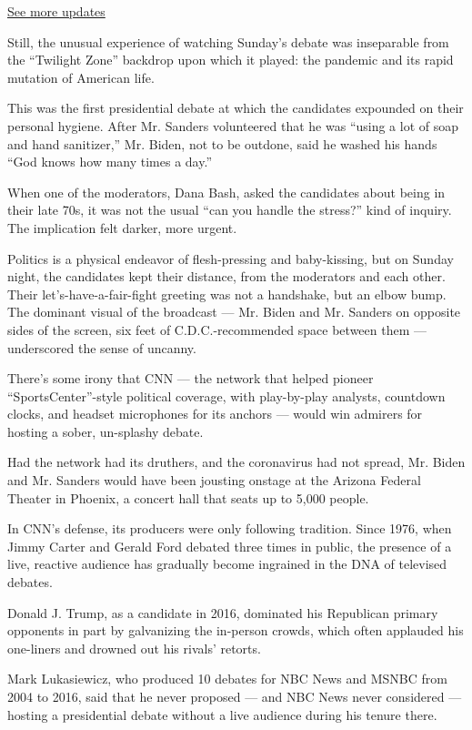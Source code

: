 \href{https://www.nytimes.com/2020/07/31/us/elections/biden-vs-trump.html?action=click\&pgtype=Article\&state=default\&region=MAIN_CONTENT_1\&context=storylines_live_updates}{See
more updates}

Still, the unusual experience of watching Sunday's debate was
inseparable from the ``Twilight Zone'' backdrop upon which it played:
the pandemic and its rapid mutation of American life.

This was the first presidential debate at which the candidates expounded
on their personal hygiene. After Mr. Sanders volunteered that he was
``using a lot of soap and hand sanitizer,'' Mr. Biden, not to be
outdone, said he washed his hands ``God knows how many times a day.''

When one of the moderators, Dana Bash, asked the candidates about being
in their late 70s, it was not the usual ``can you handle the stress?''
kind of inquiry. The implication felt darker, more urgent.

Politics is a physical endeavor of flesh-pressing and baby-kissing, but
on Sunday night, the candidates kept their distance, from the moderators
and each other. Their let's-have-a-fair-fight greeting was not a
handshake, but an elbow bump. The dominant visual of the broadcast ---
Mr. Biden and Mr. Sanders on opposite sides of the screen, six feet of
C.D.C.-recommended space between them --- underscored the sense of
uncanny.

There's some irony that CNN --- the network that helped pioneer
``SportsCenter''-style political coverage, with play-by-play analysts,
countdown clocks, and headset microphones for its anchors --- would win
admirers for hosting a sober, un-splashy debate.

Had the network had its druthers, and the coronavirus had not spread,
Mr. Biden and Mr. Sanders would have been jousting onstage at the
Arizona Federal Theater in Phoenix, a concert hall that seats up to
5,000 people.

In CNN's defense, its producers were only following tradition. Since
1976, when Jimmy Carter and Gerald Ford debated three times in public,
the presence of a live, reactive audience has gradually become ingrained
in the DNA of televised debates.

Donald J. Trump, as a candidate in 2016, dominated his Republican
primary opponents in part by galvanizing the in-person crowds, which
often applauded his one-liners and drowned out his rivals' retorts.

Mark Lukasiewicz, who produced 10 debates for NBC News and MSNBC from
2004 to 2016, said that he never proposed --- and NBC News never
considered --- hosting a presidential debate without a live audience
during his tenure there.

